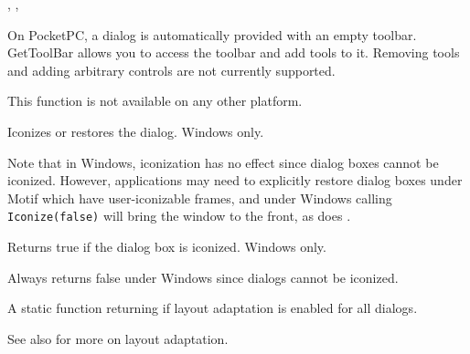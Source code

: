 
, ,\rtfsp
{}


\label{wxdialoggettoolbar}


On PocketPC, a dialog is automatically provided with an empty toolbar. GetToolBar
allows you to access the toolbar and add tools to it. Removing tools and adding
arbitrary controls are not currently supported.

This function is not available on any other platform.


\label{wxdialogiconized}


Iconizes or restores the dialog. Windows only.




Note that in Windows, iconization has no effect since dialog boxes cannot be
iconized. However, applications may need to explicitly restore dialog
boxes under Motif which have user-iconizable frames, and under Windows
calling {\tt Iconize(false)} will bring the window to the front, as does
.


\label{wxdialogisiconized}


Returns true if the dialog box is iconized. Windows only.


Always returns false under Windows since dialogs cannot be iconized.


\label{wxdialogislayoutadaptationenabled}


A static function returning \true if layout adaptation is enabled for all dialogs.

See also  for more on layout adaptation.


